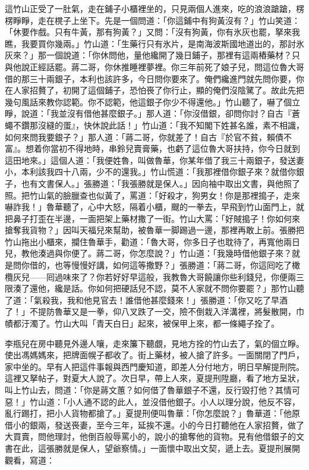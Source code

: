 這竹山正受了一肚氣，走在鋪子小櫃裡坐的，只見兩個人進來，吃的浪浪蹌蹌，楞楞睜睜，走在櫈子上坐下。{}先是一個問道：「你這鋪中有狗黃沒有？」竹山笑道：「休要作戲。只有牛黃，那有狗黃？」又問：「沒有狗黃，你有氷灰也罷，拏來我瞧，我要買你幾兩。」竹山道：「生藥行只有氷片，是南海波斯國地道出的，那討氷灰來？」那一個說道：「你休問他，量他纔開了幾日鋪子，那裡有這兩樁藥材？只與他說正經話罷。蔣二哥，你休推睡裡夢裡。你三年前死了娘子兒，問這位魯大哥借的那三十兩銀子，本利也該許多，今日問你要來了。俺們纔進門就先問你要，你在人家招贅了，初開了這個鋪子，恐怕䘮了你行止，顯的俺們沒陰騭了。故此先把幾句風話來教你認範。你不認範，他這銀子你少不得還他。」竹山聽了，嚇了個立睜，說道：「我並沒有借他甚麼銀子。」那人道：「你沒借銀，卻問你討？自古『蒼蠅不鑽那沒縫的蛋』，快休說此話！」竹山道：「我不知閣下姓甚名誰，素不相識，如何來問我要銀子？」那人道：「蔣二哥，你就差了！自古『於官不貧，賴債不富』。想着你當初不得地時，串鈴兒賣膏藥，{}也虧了這位魯大哥扶持，你今日就到這田地來。」這個人道：「我便姓魯，叫做魯華，{}你某年借了我三十兩銀子，發送妻小，本利該我四十八兩，少不的還我。」竹山慌道：「我那裡借你銀子來？就借你銀子，也有文書保人。」張勝道：「我張勝就是保人。」因向袖中取出文書，與他照了照。把竹山氣的臉臘查也似黃了，罵道：「好殺才，狗男女！你是那裡搗子，走來嚇詐我！」魯華聽了，心中大怒，隔着小櫃，颼的一拳去，早飛到竹山面門上，就把鼻子打歪在半邊，一面把架上藥材撒了一街。竹山大罵：「好賊搗子！你如何來搶奪我貨物？」因叫天福兒來幫助，被魯華一脚踢過一邊，那裡再敢上前。張勝把竹山拖出小櫃來，攔住魯華手，勸道：「魯大哥，你多日子也耽待了，再寬他兩日兒，教他湊過與你便了。蔣二哥，你怎麼說？」竹山道：「我幾時借他銀子來？就是問你借的，也等慢慢好講，如何這等撒野？」張勝道：「蔣二哥，你這囘吃了橄欖灰兒——囘過味來了？你若好好早這般，我教魯大哥饒讓你些利錢兒，你便兩三限湊了還他，纔是話。你如何把硬話兒不認，莫不人家就不問你要罷？」那竹山聽了道：「氣殺我，我和他見官去！誰借他甚麼錢來！」張勝道：「你又吃了早酒了！」不提防魯華又是一拳，仰八叉跌了一交，險不倒栽入洋溝裡，將髮散開，巾幘都汙濁了。竹山大叫「青天白日」起來，被保甲上來，都一條繩子拴了。

李瓶兒在房中聽見外邊人嚷，走來簾下聽覷，見地方拴的竹山去了，氣的個立睜。使出馮媽媽來，把牌面幌子都收了。街上藥材，被人搶了許多。一面關閉了門戶，家中坐的。早有人把這件事報與西門慶知道，即差人分付地方，明日早解提刑院。這裡又拏帖子，對夏大人說了。次日早，帶上人來，夏提刑陞廳，看了地方呈狀，叫上竹山去，問道：「你是蔣文蕙？如何借了魯華銀子不還，反行毀打他？其情可惡！」竹山道：「小人通不認的此人，並沒借他銀子。小人以理分說，他反不容，亂行踢打，把小人貨物都搶了。」夏提刑便叫魯華：「你怎麼說？」魯華道：「他原借小的銀兩，發送䘮妻，至今三年，延挨不還。小的今日打聽他在人家招贅，做了大買賣，問他理討，他倒百般辱罵小的，說小的搶奪他的貨物。見有他借銀子的文書在此，這張勝就是保人，望爺察情。」一面懷中取出文契，遞上去。夏提刑展開觀看，寫道：

